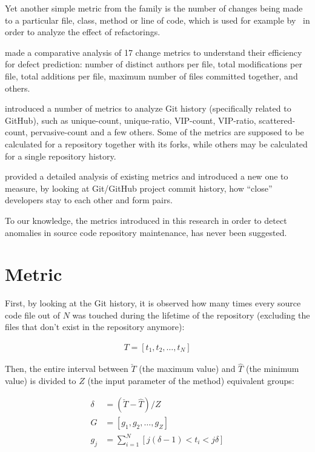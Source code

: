\documentclass[sigconf]{acmart}
\begin{document}
Yet another simple metric from the family is
the number of changes being made to a particular file, class, method
or line of code, which is used for example by~\citet{demeyer2000}
in order to analyze the effect of refactorings.

\citet{moser2008} made a comparative analysis of 17 change metrics to understand
their efficiency for defect prediction: number of distinct authors per file,
total modifications per file, total additions per file, maximum number of
files committed together, and others.

\citet{biazzini2014} introduced a number of metrics to analyze
Git history (specifically related to GitHub), such as unique-count, unique-ratio,
VIP-count, VIP-ratio, scattered-count, pervasive-count and a few others. Some
of the metrics are supposed to be calculated for a repository together with
its forks, while others may be calculated for a single repository history.

\citet{batista2018} provided a detailed analysis of existing metrics
and introduced a new one to measure, by looking at Git/GitHub project
commit history, how ``close'' developers stay to each other and form
pairs.

To our knowledge, the metrics introduced in this research in order
to detect anomalies in source code repository maintenance, has never been
suggested.

\section{Metric}
\label{sec:method}

First, by looking at the Git history,
it is observed how many times every source code file out of $N$ was touched
during the lifetime of the repository (excluding the files that don't exist
in the repository anymore):

\begin{eqnarray}
T = [t_1, t_2, \dots, t_N]
\end{eqnarray}

Then, the entire interval between $\check{T}$ (the maximum value)
and $\hat{T}$ (the minimum value) is divided to $Z$ (the input parameter of the method)
equivalent groups:

\begin{align}
\delta &= ( \check{T} - \hat{T} ) / Z \\
G &= [g_1, g_2, \dots, g_{Z}] \\
g_j &= \sum_{i=1}^N [ j(\delta-1) < t_i < j\delta ]
\end{align}
\end{document}
